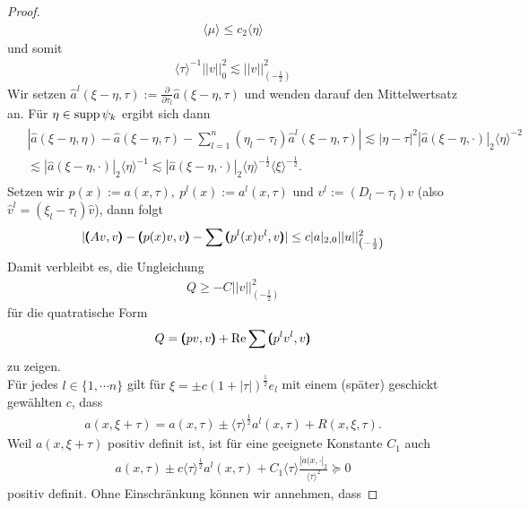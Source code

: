 \begin{proof}
\begin{align}
	\langle \mu\rangle \le c_2\langle \eta\rangle
\end{align}
und somit
\begin{align}\label{Abschaetzung 0-Norm}
	\langle \tau\rangle^{-1}|| v||_0^2 \lesssim|| v||_{\left(-\frac{1}{2}\right)}^2
\end{align}
Wir setzen $\widehat{a}^l(\xi-\eta,\tau):=\frac{\partial}{\partial \tau_l}\widehat{a}(\xi-\eta,\tau)$ und wenden darauf den Mittelwertsatz an. Für $\eta\in \operatorname{supp} \psi_k$ ergibt sich dann
\begin{align}
\begin{split}	&| \widehat{a}(\xi-\eta,\eta)-\widehat{a}(\xi-\eta,\tau) -\sum\limits_{l=1}^n (\eta_l-\tau_l)\widehat{a}^l\left(\xi-\eta,\tau\right)| \lesssim| \eta-\tau|^2| \widehat{a}(\xi-\eta,\cdot)|_2\langle\eta\rangle^{-2} \\&
\lesssim | \widehat{a}(\xi-\eta,\cdot)|_2 \langle\eta\rangle^{-1} \lesssim| \widehat{a}(\xi-\eta,\cdot)|_2\langle\eta\rangle^{-\frac{1}{2}}\langle\xi\rangle^{-\frac{1}{2}}.
\end{split}
\end{align}
Setzen wir $p(x):=a(x,\tau),\ p^l(x):= a^l(x,\tau) $ und $v^l:=(D_l-\tau_l)v$ (also $\widehat{v}^l=\left(\xi_l-\tau_l\right)\widehat{v}$), dann folgt
\begin{align}
	|\pmb(Av,v\pmb)-\pmb(p(x)v,v\pmb)-\sum\pmb(p^l(x)v^l,v\pmb)| \le c | a|_{2,0}|| u||_{\left(-\frac{1}{2}\right)}^2
\end{align}
Damit verbleibt es, die Ungleichung \begin{align}
	Q \ge -C|| v||_{\left(-\frac{1}{2}\right)}^2
\end{align}
für die quatratische Form
\begin{align}
	Q=\pmb(pv,v\pmb)+\operatorname{Re}\sum\pmb(p^lv^l,v\pmb) 
\end{align}
zu zeigen.\\
Für jedes $l\in\{1,\cdots n\}$ gilt für $\xi = \pm c(1+| \tau|)^{\frac{1}{2}}e_l$ mit einem (später) geschickt gewählten $c$, dass
\begin{align}
	a(x,\xi+\tau) = a(x,\tau)\pm\langle\tau\rangle^{\frac{1}{2}}a^l(x,\tau) + R(x,\xi,\tau). 
\end{align}
Weil $a(x,\xi+\tau)$ positiv definit ist, ist für eine geeignete Konstante $C_1$ auch
\begin{align}
	a(x,\tau) \pm c\langle\tau\rangle^{\frac{1}{2}}a^l(x,\tau)+C_1\langle\tau\rangle \frac{| a(x,\cdot|_{2}}{\langle\tau\rangle^2}\succeq 0
\end{align}
positiv definit. Ohne Einschränkung können wir annehmen, dass  

\end{proof}
